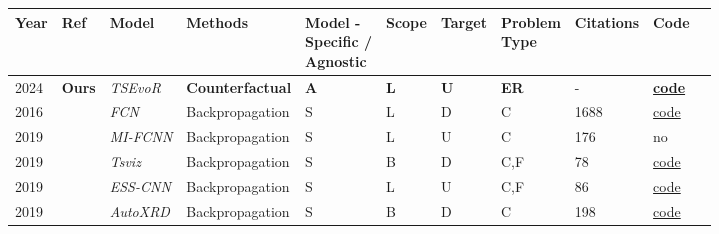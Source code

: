     
\begin{table*}[p]
  \centering
  \begin{tabular}{@{}lllllllllll@{}}
    \toprule
    Year        &   Ref                         & Model             & Methods       & \makecell{ Model - \\ Specific / \\ Agnostic}   & Scope         & Target  & \makecell{ Problem \\ Type }                       & Citations         & Code \\
    \midrule
    \midrule

    2024        & \textbf{Ours}           & \textit{TSEvoR}& \textbf{Counterfactual}           & \textbf{A}             & \textbf{L}             & \textbf{U}         & \textbf{ER}                   & -                 & \textbf{\href{https://github.com/AlexisTabin/BA-Estimation-TCN}{code}}  \\ \hline
    
    2016        &   \cite{wang_time_2016}        & \textit{FCN}      & Backpropagation     & S      & L         & D      & C                    & 1688              & \href{https://github.com/cauchyturing/UCR_Time_Series_Classification_Deep_Learning_Baseline}{code}\\ 

    2019        & \cite{strodthoff_detecting_2019}  &\textit{\footnotesize{MI-FCNN}}   & Backpropagation     &S       & L         & U   & C                    & 176               & no\\ 

    2019        & \cite{siddiqui_tsviz_2019}       &\textit{Tsviz}     & Backpropagation     &S       & B          & D      & C,F                    & 78                & \href{https://github.com/shoaibahmed/TSViz-Core}{code}\\

    2019        &   \cite{ismail_fawaz_accurate_2019}  & \textit{\footnotesize{ESS-CNN}}  & Backpropagation     &S       & L         & U   & C,F                    & 86                & \href{https://github.com/hfawaz/ijcars19}{code}\\ 

    2019        &   \cite{oviedo_fast_2019}    & \textit{AutoXRD}  & Backpropagation     &S       & B          & D      & C                    & 198               & \href{https://github.com/PV-Lab/autoXRD/tree/master}{code}\\ 


\end{tabular}
\end{table*}
